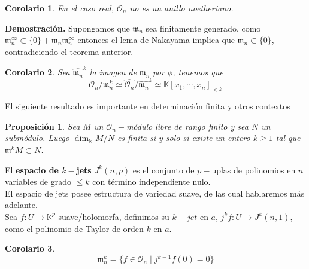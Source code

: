 \documentclass[12pt]{book}
\newtheorem{teo}{Teorema}
\newtheorem{pro}{Proposición}
\newtheorem{cor}{Corolario}
\newcommand{\oo}{\mathcal{O}_n}
\newcommand{\mm}{\mathfrak{m}_n}
\begin{document}
\begin{cor}
	En el caso real, $\oo$ no es un anillo noetheriano.
\end{cor}
\textbf{Demostración.} Supongamos que $\mm$ sea finitamente generado, como $\mm ^\infty\subset \{0\} + \mm \mm^\infty$ entonces el lema de Nakayama implica que $ \mm \subset \{0\}$, contradiciendo el teorema anterior.
\begin{cor}
Sea $\hat{\mm}^k$ la imagen de $\mm $ por $\phi$, tenemos que $$ \oo / \mm ^k \simeq \hat{\oo} / \hat{\mm}^k \simeq \mathbb{K}[x_1 , \cdots , x_n] _{<k}$$
\end{cor}


El siguiente resultado es importante en determinación finita y otros contextos
\begin{pro}
	Sea $M$ un $\oo-$módulo libre de rango finito y sea $N$ un submódulo. Luego $\dim _\mathbb{K} M/N$ es finita si y solo si existe un entero $k\geq 1$ tal que $\mathfrak{m} ^k M \subset N$.
\end{pro}


%
%





El \textbf{espacio de $k-$jets} $J^k (n,p)$ es el conjunto de $p-$uplas de polinomios en $n$ variables de grado $\leq k$ con término independiente nulo.\\
El espacio de jets posee estructura de variedad suave, de las cual hablaremos más adelante.\\
Sea $f:U \rightarrow \mathbb{K}^p $ suave/holomorfa, definimos su $k-jet$ en $a$, $ j^k f :U \rightarrow J^k (n,1) $, como el polinomio de Taylor de orden $k$ en $a$. 

\begin{cor}
$$\mm ^k = \{f \in \oo \; | \; j^{k-1} f (0) =0\}$$
\end{cor}
\end{document}
